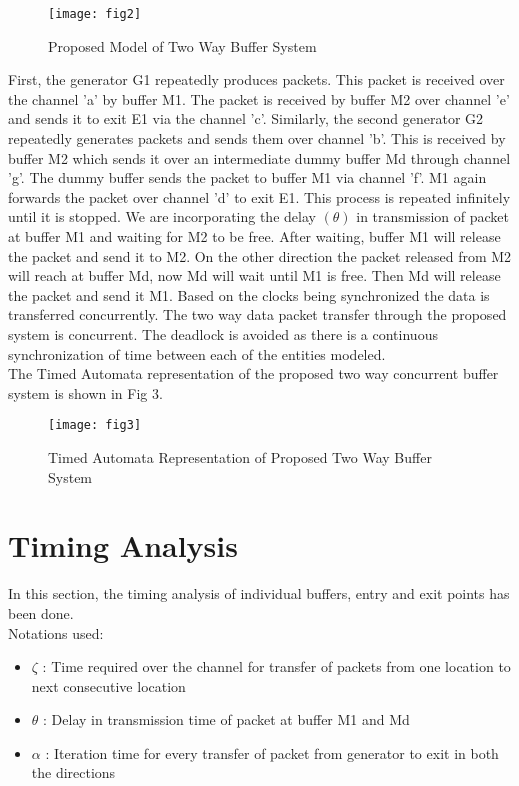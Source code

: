 \documentclass[letterpaper]{article}
\begin{document}
\begin{figure}[bpht!]
\centering
	\texttt{[image: fig2]}
	\caption{Proposed Model of Two Way Buffer System}
	\label{Fig2}
\end{figure}
	
First, the generator G1 repeatedly produces packets. This packet is received over the channel 'a' by buffer M1. The packet is received by buffer M2 over channel 'e' and sends it to exit E1 via the channel 'c'. Similarly, the second generator G2 repeatedly generates packets and sends them over channel 'b'. This is received by buffer M2 which sends it over an intermediate dummy buffer Md through channel 'g'. The dummy buffer sends the packet to buffer M1 via channel 'f'. M1 again forwards the packet over channel 'd' to exit E1. This process is repeated infinitely until it is stopped. We are incorporating the delay $(\theta)$ in transmission of packet at buffer M1 and waiting for M2 to be free. After waiting, buffer M1 will release the packet and send it to M2. On the other direction the packet released from M2 will reach at buffer Md, now Md will wait until M1 is free. Then Md will release the packet and send it M1. Based on the clocks being synchronized the data is transferred concurrently. The two way data packet transfer through the proposed system is concurrent. The deadlock is avoided as there is a continuous synchronization of time between each of the entities modeled. \\ 
The Timed Automata representation of the proposed two way concurrent buffer system is shown in Fig 3. 

\begin{figure}[bpht!]
\centering
	\texttt{[image: fig3]}
	\caption{Timed Automata Representation of Proposed Two Way Buffer System}
\end{figure}
	





\section{Timing Analysis}
\label{7}
In this section, the timing analysis of individual buffers, entry and exit points has been done.\\
Notations used:
\begin{itemize}
	\item $\zeta$ : Time required over the channel for transfer of packets from one location to next consecutive location
	\item $\theta$ : Delay in transmission time of packet at buffer M1 and Md
	\item $\alpha$ : Iteration time for every transfer of packet from generator to exit in both the directions
\end{itemize}
\end{document}
